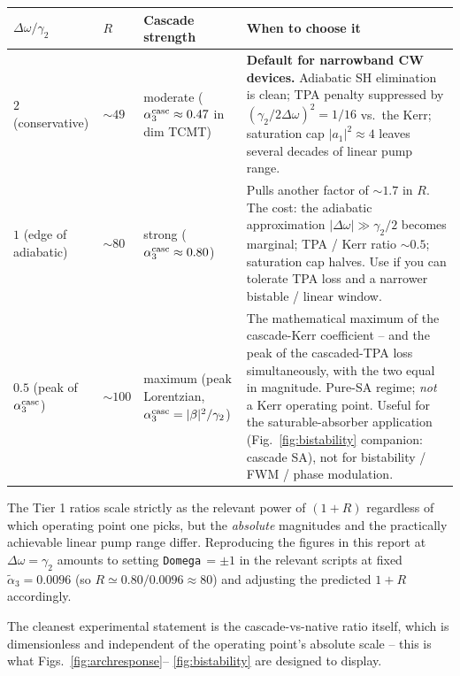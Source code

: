 \documentclass[11pt,a4paper]{article}
\newcommand{\Dom}{\Delta\omega}
\begin{document}
\begin{center}
\renewcommand{\arraystretch}{1.25}
\setlength{\tabcolsep}{4pt}
\footnotesize
\begin{tabular}{>{\raggedright\arraybackslash}p{}
                >{\raggedright\arraybackslash}p{}
                >{\raggedright\arraybackslash}p{}
                >{\raggedright\arraybackslash}p{}}
\toprule
$\Dom/\gamma_2$ & $R$ & Cascade strength & When to choose it \\
\midrule
$2$ (conservative) & $\sim 49$ &
moderate ($\alpha_3^{\rm casc} \approx 0.47$ in dim TCMT) &
\textbf{Default for narrowband CW devices.} Adiabatic SH elimination
is clean; TPA penalty suppressed by $(\gamma_2/2\Dom)^2 = 1/16$ vs.\
the Kerr; saturation cap $|a_1|^2 \approx 4$ leaves several decades
of linear pump range. \\
$1$ (edge of adiabatic) & $\sim 80$ &
strong ($\alpha_3^{\rm casc} \approx 0.80$) &
Pulls another factor of $\sim\!1.7$ in $R$. The cost: the
adiabatic approximation $|\Dom| \gg \gamma_2/2$ becomes marginal;
TPA / Kerr ratio $\sim 0.5$; saturation cap halves. Use if you can
tolerate TPA loss and a narrower bistable / linear window. \\
$0.5$ (peak of $\alpha_3^{\rm casc}$) & $\sim 100$ &
maximum (peak Lorentzian, $\alpha_3^{\rm casc} = |\beta|^2/\gamma_2$) &
The mathematical maximum of the cascade-Kerr coefficient -- and the
peak of the cascaded-TPA loss simultaneously, with the two equal in
magnitude. Pure-SA regime; \emph{not} a Kerr operating point.
Useful for the saturable-absorber application (Fig.~\ref{fig:bistability}
companion: cascade SA), not for bistability / FWM / phase modulation. \\
\bottomrule
\end{tabular}
\end{center}

The Tier 1 ratios scale strictly as the relevant power of $(1+R)$
regardless of which operating point one picks, but the
\emph{absolute} magnitudes and the practically achievable linear pump
range differ.  Reproducing the figures in this report at $\Dom = \gamma_2$
amounts to setting \texttt{Domega}$\,=\pm1$ in the relevant scripts at
fixed $\widetilde\alpha_3=0.0096$ (so $R\simeq0.80/0.0096\approx80$) and
adjusting the predicted $1+R$ accordingly.

The cleanest experimental statement is the cascade-vs-native ratio
itself, which is dimensionless and independent of the operating
point's absolute scale -- this is what Figs.~\ref{fig:archresponse}--%
\ref{fig:bistability} are designed to display.
\end{document}
